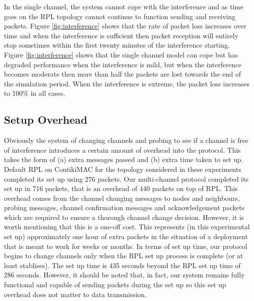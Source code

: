 In the single channel, the system cannot cope with the interference and as time goes on the RPL topology cannot continue to function sending and receiving packets. Figure \ref{fig:interference} shows that the rate of packet loss increases over time and when the interference is sufficient then packet reception will entirely stop sometimes within the first twenty minutes of the interference starting.  Figure \ref{fig:interference} shows that the single channel model can cope but has degraded performance when the interference is mild, but when the interference becomes moderate then more than half the packets are lost towards the end of the simulation period.  When the interference is extreme, the packet loss increases to 100\% 
in all cases.

\subsection{Setup Overhead}




Obviously the system of changing channels and probing to see if a channel is free of interference introduces a certain amount of overhead into
the protocol.  This takes the form of (a) extra messages passed and (b) extra time taken to set up.  Default RPL on ContikiMAC for the topology considered in these experiments completed its set up using 276 packets.  Our multi-channel protocol completed its set up in 716 packets, that is an overhead of 440 packets on top of RPL. 
This overhead comes from the channel changing messages to nodes and neighbours, probing messages, channel confirmation messages and acknowledgement packets which are required to ensure a thorough channel change decision.
However, it is worth mentioning that this is a one-off cost.  This represents (in this experimental set up) approximately one hour of extra packets in the situation of a deployment that is meant to work for weeks or months.  In terms of set up time, our protocol begins to change channels only when the RPL set up process is complete (or at least stablises).  The set up time is 435 seconds beyond the 
RPL set up time of 286 seconds.  However, it should be noted that, in fact, our system remains fully functional and capable of sending packets during
the set up so this set up overhead does not matter to data transmission.
